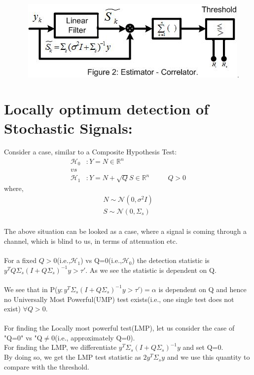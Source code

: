 \documentclass[a4paper,english,12pt]{article}
\begin{document}
 \ \ \ \ \ \ \ \includegraphics{Figures/figure2}.
 \section{Locally optimum detection of Stochastic Signals:}
 Consider a case, similar to a Composite Hypothesis Test:\\
 \begin{align*}
 \mathcal{H}_0 &: Y = N \in \mathbb{R}^n\\
 vs \\
 \mathcal{H}_1 &: Y = N+\sqrt{Q}S \in \mathbb{R}^n \ \ \ \ \ \ \ \ \ \ \ \ Q>0
 \end{align*}
 where,  
 \begin{align*}  
 N\sim \mathcal{N}(0,\sigma^2I)\\
 S\sim \mathcal{N}(0,\Sigma_s)
 \end{align*} \\
 The above situation can be looked as a case, where a signal is coming through a channel, which is blind to us, in terms of attenuation etc.\\
 \\For a fixed $Q>0$(i.e.,$\mathcal{H}_1$) vs Q=0(i.e.,$\mathcal{H}_0$) the detection statistic is\\ $y^TQ\Sigma_s(I+Q\Sigma_s)^{-1}y>\tau'$. As we see the statistic is dependent on Q.\\
 \\We see that in P($y:y^T\Sigma_s(I+Q\Sigma_s)^{-1}y>\tau') = \alpha$ is dependent on Q and hence no Universally Most Powerful(UMP) test exists(i.e., one single test does not exist) $\forall Q>0$.\\
\\ For finding the Locally most powerful test(LMP), let us consider the case of "Q=0" vs "Q$\neq$0(i.e., approximately Q=0).\\
For finding the LMP, we differentiate $y^T\Sigma_s(I+Q\Sigma_s)^{-1}y$ and set Q=0.\\
By doing so, we get the LMP test statistic as $2y^T\Sigma_sy$ and we use this quantity to compare with the threshold.\\
\end{document}

